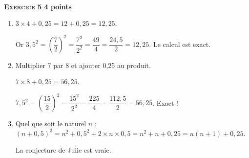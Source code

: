 \textbf{\textsc{Exercice 5} \hfill 4 points}

\bigskip
 
% 
%

\begin{enumerate}
\item %
$3 \times 4  + 0,25 = 12 + 0,25 = 12,25$.

Or $3,5^2 = \left(\dfrac{7}{2} \right)^2 = \dfrac{7^2}{2^2} = \dfrac{49}{4} = \dfrac{24,5}{2} = 12,25$. Le calcul est exact. 
\item %
Multiplier 7 par 8 et ajouter 0,25 au produit.

$7 \times 8 + 0,25 = 56,25$.

$7,5^2 = \left(\dfrac{15}{2} \right)^2 = \dfrac{15^2}{2^2} = \dfrac{225}{4} = \dfrac{112,5}{2} = 56,25$. Exact ! 
\item %


Quel que soit le naturel $n$ : $(n + 0,5)^2 = n^2 + 0,5^2 + 2 \times n \times 0,5 = n^2 + n + 0,25 = n(n + 1) + 0,25$.

La  conjecture de Julie est vraie.
\end{enumerate} 

\bigskip

